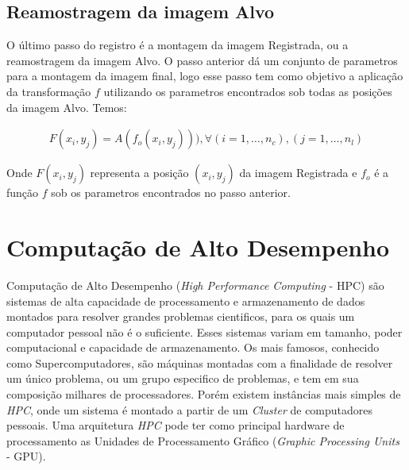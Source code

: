 \subsection{Reamostragem da imagem Alvo}

    O último passo do registro é a montagem da imagem Registrada, ou a reamostragem da imagem Alvo. O passo anterior
dá um conjunto de parametros para a montagem da imagem final, logo esse passo tem como objetivo a aplicação
da transformação $f$ utilizando os parametros encontrados sob todas as posições da imagem Alvo. Temos:

\begin{align}\label{eq:reamostragem}
    F(x_i,y_j) = A(f_o(x_i,y_j))), \forall (i = 1, \dots, n_c), (j = 1, \dots, n_l)
\end{align}

    Onde $F(x_i,y_j)$ representa a posição $(x_i,y_j)$ da imagem Registrada e $f_o$ é a função $f$ sob os parametros
encontrados no passo anterior.

\section{Computação de Alto Desempenho}\label{GPGPU}
    
    Computação de Alto Desempenho (\textit{High Performance Computing} - HPC) são sistemas de alta capacidade de processamento
e armazenamento de dados montados para resolver grandes problemas cientificos, para os quais um computador pessoal não
é o suficiente. Esses sistemas variam em tamanho, poder computacional e capacidade de armazenamento. Os mais famosos,
conhecido como Supercomputadores, são máquinas montadas com a finalidade de resolver um único problema, ou um grupo
especifico de problemas, e tem em sua composição milhares de processadores. Porém existem instâncias mais simples de 
\textit{HPC}, onde um sistema é montado a partir de um \textit{Cluster} de computadores pessoais. Uma arquitetura \textit{HPC}
pode ter como principal hardware de processamento as Unidades de Processamento Gráfico (\textit{Graphic Processing Units} - GPU).

